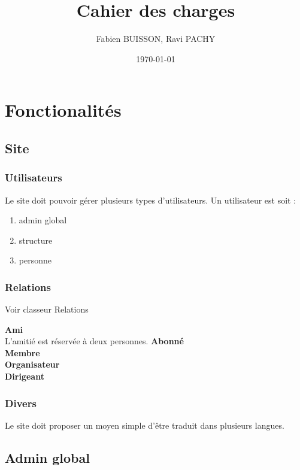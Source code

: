 \documentclass[11pt]{article}
\title{\textbf{Cahier des charges}}
\author{Fabien BUISSON, Ravi PACHY}
\date{\today}
\begin{document}
\maketitle

\section{Fonctionalités}

\subsection{Site}
\label{sub:site}

\subsubsection{Utilisateurs}

Le site doit pouvoir gérer plusieurs types d'utilisateurs.
Un utilisateur est soit :
\begin{enumerate}
  \item admin global
  \item structure
  
  \item personne
\end{enumerate}

\subsubsection{Relations}

Voir classeur Relations

{\bf Ami}\\[0.6em]
L'amitié est réservée à deux personnes.
{\bf Abonné}\\[0.6em]
{\bf Membre}\\[0.6em]
{\bf Organisateur}\\[0.6em]
{\bf Dirigeant}\\[0.6em]

\subsubsection{Divers}
Le site doit proposer un moyen simple d'être traduit dans plusieurs langues.

\subsection{Admin global}


\end{document}
